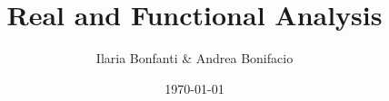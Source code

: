 \documentclass[a4paper,12pt]{article}
\theoremstyle{break}
\begin{document}
\title{Real and Functional Analysis}
\author{Ilaria Bonfanti \& Andrea Bonifacio}
\date{\today}
\maketitle
\newpage



  



















\end{document}
